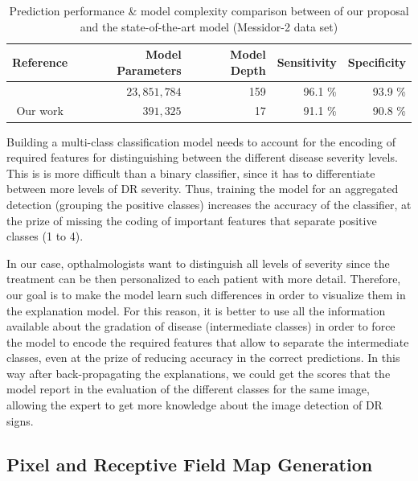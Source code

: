 \documentclass[review]{elsarticle}
\theoremstyle{definition} %
\theoremstyle{remark}
\begin{document}
\begin{table}[ht]
	\centering
	\begin{tabular}{crrrr}
		\hline
		Reference & Model Parameters & Model Depth & Sensitivity & Specificity\\ \hline
		\cite{doi:10.1001/jama.2016.17216} & $23,851,784$ & 159 & 96.1 \% & 93.9 \% \\ 
		Our work & $391,325$ & 17 & 91.1 \% & 90.8 \% \\
		\hline	
	\end{tabular}
	\caption{Prediction performance \& model complexity comparison between of our proposal and the state-of-the-art model (Messidor-2 data set)}
	\label{tab:bench} 
\end{table}

Building a multi-class classification model needs to account for the encoding of required features for distinguishing between the different disease severity levels. This is is more difficult than a binary classifier, since it has to differentiate between more levels of DR severity. Thus, training the model for an aggregated detection (grouping the positive classes) increases the accuracy of the classifier, at the prize of missing the coding of important features that separate positive classes (1 to 4).

In our case, opthalmologists want to distinguish all levels of severity since the treatment can be then personalized to each patient with more detail. Therefore, our goal is to make the model learn such differences in order to visualize them in the explanation model. For this reason, it is better to use all the information available about the gradation of disease (intermediate classes) in order to force the model to encode the required features that allow to separate the intermediate classes, even at the prize of reducing accuracy in the correct predictions. In this way after back-propagating the explanations, we could get the scores that the model report in the evaluation of the different classes for the same image, allowing the expert to get more knowledge about the image detection of DR signs.


\subsection{Pixel and Receptive Field Map Generation}
\end{document}
